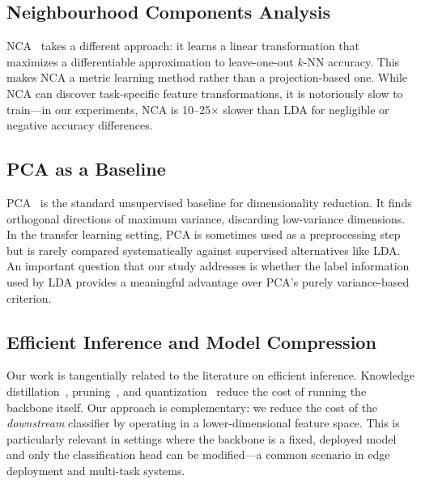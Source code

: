 \subsection{Neighbourhood Components Analysis}

NCA~\cite{goldberger2004nca} takes a different approach: it learns a linear transformation that maximizes a differentiable approximation to leave-one-out $k$-NN accuracy. This makes NCA a metric learning method rather than a projection-based one. While NCA can discover task-specific feature transformations, it is notoriously slow to train---in our experiments, NCA is 10--25$\times$ slower than LDA for negligible or negative accuracy differences.

\subsection{PCA as a Baseline}

PCA~\cite{pearson1901pca} is the standard unsupervised baseline for dimensionality reduction. It finds orthogonal directions of maximum variance, discarding low-variance dimensions. In the transfer learning setting, PCA is sometimes used as a preprocessing step~\cite{sharif2014cnn} but is rarely compared systematically against supervised alternatives like LDA. An important question that our study addresses is whether the label information used by LDA provides a meaningful advantage over PCA's purely variance-based criterion.

\subsection{Efficient Inference and Model Compression}

Our work is tangentially related to the literature on efficient inference. Knowledge distillation~\cite{hinton2015distilling}, pruning~\cite{han2015learning}, and quantization~\cite{jacob2018quantization} reduce the cost of running the backbone itself. Our approach is complementary: we reduce the cost of the \emph{downstream} classifier by operating in a lower-dimensional feature space. This is particularly relevant in settings where the backbone is a fixed, deployed model and only the classification head can be modified---a common scenario in edge deployment and multi-task systems.
